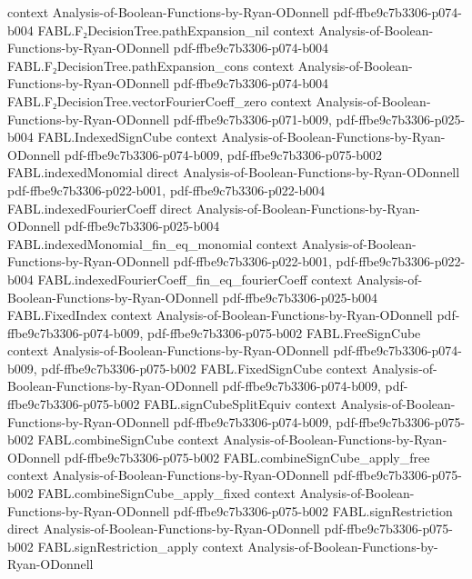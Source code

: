 \begin{theorem}
  {context}
  {Analysis-of-Boolean-Functions-by-Ryan-ODonnell}
  {pdf-ffbe9c7b3306-p074-b004}
\proofstep
  {FABL.F₂DecisionTree.pathExpansion_nil}
  {context}
  {Analysis-of-Boolean-Functions-by-Ryan-ODonnell}
  {pdf-ffbe9c7b3306-p074-b004}
\proofstep
  {FABL.F₂DecisionTree.pathExpansion_cons}
  {context}
  {Analysis-of-Boolean-Functions-by-Ryan-ODonnell}
  {pdf-ffbe9c7b3306-p074-b004}
\proofstep
  {FABL.F₂DecisionTree.vectorFourierCoeff_zero}
  {context}
  {Analysis-of-Boolean-Functions-by-Ryan-ODonnell}
  {pdf-ffbe9c7b3306-p071-b009,
    pdf-ffbe9c7b3306-p025-b004}
\proofstep
  {FABL.IndexedSignCube}
  {context}
  {Analysis-of-Boolean-Functions-by-Ryan-ODonnell}
  {pdf-ffbe9c7b3306-p074-b009,
    pdf-ffbe9c7b3306-p075-b002}
\proofstep
  {FABL.indexedMonomial}
  {direct}
  {Analysis-of-Boolean-Functions-by-Ryan-ODonnell}
  {pdf-ffbe9c7b3306-p022-b001,
    pdf-ffbe9c7b3306-p022-b004}
\proofstep
  {FABL.indexedFourierCoeff}
  {direct}
  {Analysis-of-Boolean-Functions-by-Ryan-ODonnell}
  {pdf-ffbe9c7b3306-p025-b004}
\proofstep
  {FABL.indexedMonomial_fin_eq_monomial}
  {context}
  {Analysis-of-Boolean-Functions-by-Ryan-ODonnell}
  {pdf-ffbe9c7b3306-p022-b001,
    pdf-ffbe9c7b3306-p022-b004}
\proofstep
  {FABL.indexedFourierCoeff_fin_eq_fourierCoeff}
  {context}
  {Analysis-of-Boolean-Functions-by-Ryan-ODonnell}
  {pdf-ffbe9c7b3306-p025-b004}
\proofstep
  {FABL.FixedIndex}
  {context}
  {Analysis-of-Boolean-Functions-by-Ryan-ODonnell}
  {pdf-ffbe9c7b3306-p074-b009,
    pdf-ffbe9c7b3306-p075-b002}
\proofstep
  {FABL.FreeSignCube}
  {context}
  {Analysis-of-Boolean-Functions-by-Ryan-ODonnell}
  {pdf-ffbe9c7b3306-p074-b009,
    pdf-ffbe9c7b3306-p075-b002}
\proofstep
  {FABL.FixedSignCube}
  {context}
  {Analysis-of-Boolean-Functions-by-Ryan-ODonnell}
  {pdf-ffbe9c7b3306-p074-b009,
    pdf-ffbe9c7b3306-p075-b002}
\proofstep
  {FABL.signCubeSplitEquiv}
  {context}
  {Analysis-of-Boolean-Functions-by-Ryan-ODonnell}
  {pdf-ffbe9c7b3306-p074-b009,
    pdf-ffbe9c7b3306-p075-b002}
\proofstep
  {FABL.combineSignCube}
  {context}
  {Analysis-of-Boolean-Functions-by-Ryan-ODonnell}
  {pdf-ffbe9c7b3306-p075-b002}
\proofstep
  {FABL.combineSignCube_apply_free}
  {context}
  {Analysis-of-Boolean-Functions-by-Ryan-ODonnell}
  {pdf-ffbe9c7b3306-p075-b002}
\proofstep
  {FABL.combineSignCube_apply_fixed}
  {context}
  {Analysis-of-Boolean-Functions-by-Ryan-ODonnell}
  {pdf-ffbe9c7b3306-p075-b002}
\proofstep
  {FABL.signRestriction}
  {direct}
  {Analysis-of-Boolean-Functions-by-Ryan-ODonnell}
  {pdf-ffbe9c7b3306-p075-b002}
\proofstep
  {FABL.signRestriction_apply}
  {context}
  {Analysis-of-Boolean-Functions-by-Ryan-ODonnell}

\end{theorem}

